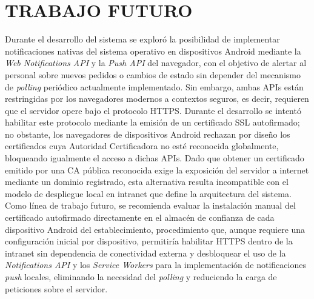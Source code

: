 \chapter{TRABAJO FUTURO}
\label{cap:trabajo_futuro}

Durante el desarrollo del sistema se explor\'{o} la posibilidad de implementar notificaciones 
nativas del sistema operativo en dispositivos Android mediante la \textit{Web Notifications API} 
y la \textit{Push API} del navegador, con el objetivo de alertar al personal sobre nuevos pedidos 
o cambios de estado sin depender del mecanismo de \textit{polling} peri\'{o}dico actualmente 
implementado. Sin embargo, ambas APIs est\'{a}n restringidas por los navegadores modernos 
a contextos seguros, es decir, requieren que el servidor opere bajo el protocolo HTTPS. Durante 
el desarrollo se intent\'{o} habilitar este protocolo mediante la emisi\'{o}n de un certificado 
SSL autofirmado; no obstante, los navegadores de dispositivos Android rechazan por dise\~{n}o 
los certificados cuya Autoridad Certificadora no est\'{e} reconocida globalmente, bloqueando 
igualmente el acceso a dichas APIs. Dado que obtener un certificado emitido por una CA p\'{u}blica 
reconocida exige la exposici\'{o}n del servidor a internet mediante un dominio registrado, esta 
alternativa resulta incompatible con el modelo de despliegue local en intranet que define la 
arquitectura del sistema. Como l\'{i}nea de trabajo futuro, se recomienda evaluar la instalaci\'{o}n 
manual del certificado autofirmado directamente en el almac\'{e}n de confianza de cada dispositivo 
Android del establecimiento, procedimiento que, aunque requiere una configuraci\'{o}n inicial por 
dispositivo, permitir\'{i}a habilitar HTTPS dentro de la intranet sin dependencia de conectividad 
externa y desbloquear el uso de la \textit{Notifications API} y los \textit{Service Workers} para 
la implementaci\'{o}n de notificaciones \textit{push} locales, eliminando la necesidad del 
\textit{polling} y reduciendo la carga de peticiones sobre el servidor.

